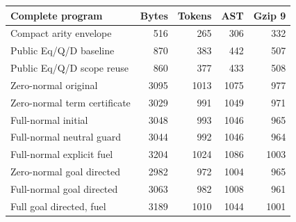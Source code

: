 \begin{center}\small
\begin{tabular}{lrrrr}\toprule
Complete program & Bytes & Tokens & AST & Gzip 9\\\midrule
Compact arity envelope & 516 & 265 & 306 & 332 \\
Public Eq/Q/D baseline & 870 & 383 & 442 & 507 \\
Public Eq/Q/D scope reuse & 860 & 377 & 433 & 508 \\
Zero-normal original & 3095 & 1013 & 1075 & 977 \\
Zero-normal term certificate & 3029 & 991 & 1049 & 971 \\
Full-normal initial & 3048 & 993 & 1046 & 965 \\
Full-normal neutral guard & 3044 & 992 & 1046 & 964 \\
Full-normal explicit fuel & 3204 & 1024 & 1086 & 1003 \\
Zero-normal goal directed & 2982 & 972 & 1004 & 965 \\
Full-normal goal directed & 3063 & 982 & 1008 & 961 \\
Full goal directed, fuel & 3189 & 1010 & 1044 & 1001 \\
\bottomrule\end{tabular}
\end{center}
